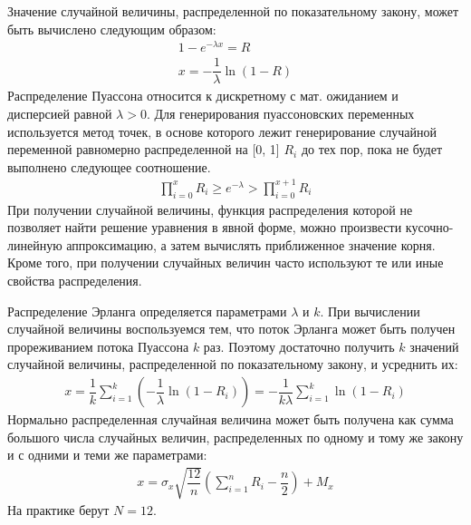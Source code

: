 Значение случайной величины, распределенной по показательному закону, может быть вычислено следующим образом:
%
\begin{gather*}
    1 - e^{-\lambda x} = R\\
    x = -\dfrac{1}{\lambda}\ln(1-R)
\end{gather*}
%
Распределение Пуассона относится к дискретному с мат. ожиданием и дисперсией равной ${\lambda > 0}$. Для генерирования пуассоновских переменных используется метод точек, в основе которого лежит генерирование случайной переменной равномерно распределенной на [0, 1] $R_i$ до тех пор, пока не будет выполнено следующее соотношение.
%
\begin{gather*}
    \prod\limits_{i=0}^{x}R_i\geqslant e^{-\lambda} > \prod\limits_{i=0}^{x+1}R_i
\end{gather*}
%
При получении случайной величины, функция распределения которой не позволяет найти решение уравнения в явной форме, можно произвести кусочно-линейную аппроксимацию, а затем вычислять приближенное значение корня. Кроме того, при получении случайных величин часто используют те или иные свойства распределения.

Распределение Эрланга определяется параметрами $\lambda$ и $k$. При вычислении случайной величины воспользуемся тем, что поток Эрланга может быть получен прореживанием потока Пуассона $k$ раз. Поэтому достаточно получить $k$ значений случайной величины, распределенной по показательному закону, и усреднить их:
%
\begin{gather*}
    x = \dfrac{1}{k}\sum\limits_{i=1}^{k}\left(-\dfrac{1}{\lambda}\ln(1-R_i)\right) = -\dfrac{1}{k\lambda} \sum\limits_{i=1}^{k}\ln(1-R_i)
\end{gather*}
%
Нормально распределенная случайная величина может быть получена как сумма большого числа случайных величин, распределенных по одному и тому же закону и с одними и теми же параметрами:
%
\begin{gather*}
    x = \sigma_x\sqrt{\dfrac{12}{n}}\left(\sum\limits_{i=1}^n R_i - \dfrac{n}{2}\right) + M_x
\end{gather*}
%
На практике берут ${N = 12}$.